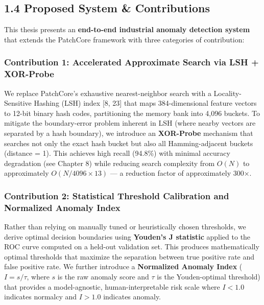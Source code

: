 \subsection{1.4 Proposed System \& Contributions}\label{proposed-system-contributions}

This thesis presents an \textbf{end-to-end industrial anomaly detection system} that extends the PatchCore framework with three categories of contribution:

\subsubsection{Contribution 1: Accelerated Approximate Search via LSH + XOR-Probe}\label{contribution-1-accelerated-approximate-search-via-lsh-xor-probe}

We replace PatchCore's exhaustive nearest-neighbor search with a Locality-Sensitive Hashing (LSH) index {[}8, 23{]} that maps 384-dimensional feature vectors to 12-bit binary hash codes, partitioning the memory bank into 4,096 buckets. To mitigate the boundary-error problem inherent in LSH (where nearby vectors are separated by a hash boundary), we introduce an \textbf{XOR-Probe} mechanism that searches not only the exact hash bucket but also all Hamming-adjacent buckets (distance = 1). This achieves high recall (94.8\%) with minimal accuracy degradation (see Chapter 8) while reducing search complexity from \(O(N)\) to approximately \(O(N/4096 \times 13)\) --- a reduction factor of approximately 300×.

\subsubsection{Contribution 2: Statistical Threshold Calibration and Normalized Anomaly Index}\label{contribution-2-statistical-threshold-calibration-and-normalized-anomaly-index}

Rather than relying on manually tuned or heuristically chosen thresholds, we derive optimal decision boundaries using \textbf{Youden's J statistic} applied to the ROC curve computed on a held-out validation set. This produces mathematically optimal thresholds that maximize the separation between true positive rate and false positive rate. We further introduce a \textbf{Normalized Anomaly Index} (\(I = s / \tau\), where \(s\) is the raw anomaly score and \(\tau\) is the Youden-optimal threshold) that provides a model-agnostic, human-interpretable risk scale where \(I < 1.0\) indicates normalcy and \(I > 1.0\) indicates anomaly.


